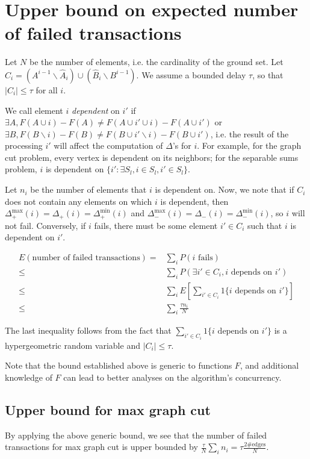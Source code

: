 \section{Upper bound on expected number of failed transactions}
\label{app:proofocc}
Let $N$ be the number of elements, i.e. the cardinality of the ground set.
Let $C_i = (A^{i-1} \backslash \hat{A}_i) \cup (\hat{B}_i \backslash B^{i-1})$.
We assume a bounded delay $\tau$, so that $|C_i| \leq \tau$ for all $i$.

We call element $i$ \textit{dependent} on $i'$ if $\exists A, F(A\cup i)-F(A) \neq F(A\cup i' \cup i)-F(A\cup i')$ or $\exists B, F(B\backslash i)-F(B) \neq F(B\cup i'\backslash i) - F(B\cup i')$, i.e. the result of the processing $i'$ will affect the computation of $\Delta$'s for $i$.
For example, for the graph cut problem, every vertex is dependent on its neighbors; for the separable sums problem, $i$ is dependent on $\{i': \exists S_l, i\in S_l, i'\in S_l\}$.

Let $n_i$ be the number of elements that $i$ is dependent on.
Now, we note that if $C_i$ does not contain any elements on which $i$ is dependent, then $\Delta_{+}^\text{max}(i) = \Delta_{+}(i) = \Delta_{+}^\text{min}(i)$ and $\Delta_{-}^\text{max}(i) = \Delta_{-}(i) = \Delta_{-}^\text{min}(i)$, so $i$ will not fail.
Conversely, if $i$ fails, there must be some element $i'\in C_i$ such that $i$ is dependent on $i'$.

\begin{align*}
E(\text{number of failed transactions})
=& \sum_i P(i \text{ fails})\\
\leq& \sum_i P(\exists i'\in C_i, i \text{ depends on } i')\\
\leq& \sum_i E\left[\sum_{i'\in C_i} 1\{i \text{ depends on } i'\}\right]\\
\leq& \sum_i \frac{\tau n_i}{N}
\end{align*}

The last inequality follows from the fact that $\sum_{i'\in C_i} 1\{i \text{ depends on } i'\}$ is a hypergeometric random variable and $|C_i| \leq \tau$.

Note that the bound established above is generic to functions $F$, and additional knowledge of $F$ can lead to better analyses on the algorithm's concurrency.



\subsection{Upper bound for max graph cut}
By applying the above generic bound, we see that the number of failed transactions for max graph cut is upper bounded by $\frac{\tau}{N}\sum_i n_i = \tau \frac{2\#\text{edges}}{N}$.


